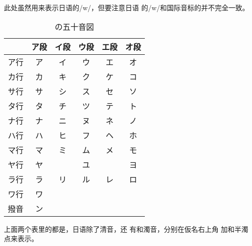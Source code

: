 \documentclass[a4paper]{ctexart}
\makeatletter
\def\arraycentercr{\let\newline\@centercr}
\makeatother
\begin{document}
此处虽然用{\ipafont [ɰ]}来表示日语的{\ipafont /w/}，但要注意日语
的{\ipafont /w/}和国际音标的{\ipafont [ɰ]}并不完全一致。

\begin{table}[H]
  \centering
  \renewcommand{\tabularxcolumn}[1]{
    >{\centering\arraybackslash\arraycentercr}m{#1}}
  \begin{tabularx}{4in}{c*{5}{|C{X}}}
      & ア段
      & イ段
      & ウ段
      & エ段
      & オ段 \\
    \hline
    ア行
      & ア
      & イ
      & ウ
      & エ
      & オ \\
    \hline
    カ行
      & カ
      & キ
      & ク
      & ケ
      & コ \\
    \hline
    サ行
      & サ
      & シ
      & ス
      & セ
      & ソ \\
    \hline
    タ行
      & タ
      & チ
      & ツ
      & テ
      & ト \\
    \hline
    ナ行
      & ナ
      & ニ
      & ヌ
      & ネ
      & ノ \\
    \hline
    ハ行
      & ハ
      & ヒ
      & フ
      & ヘ
      & ホ \\
    \hline
    マ行
      & マ
      & ミ
      & ム
      & メ
      & モ \\
    \hline
    ヤ行
      & ヤ
      & \
      & ユ
      & \
      & ヨ \\
    \hline
    ラ行
      & ラ
      & リ
      & ル
      & レ
      & ロ \\
    \hline
    ワ行
      & ワ
      & \
      & \
      & \
      & \  \\
    \hline
    撥音
      & ン
  \end{tabularx}
  \caption{の五十音図}
\end{table}

上面两个表里的都是，日语除了清音，还
有和濁音，分别在仮名右上角
加\ruby{濁|点}{だく|てん}和半濁点来表示。
\end{document}
